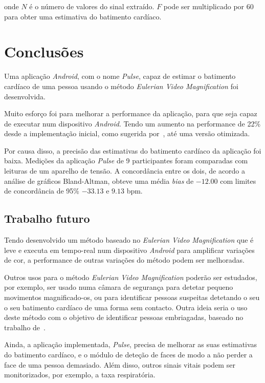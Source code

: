 \documentclass[9pt,a4paper]{extarticle}
\newcommand{\evm}{\emph{Eulerian Video Magnification}}
\begin{document}
\begin{multicols}{2}
onde $N$ é o número de valores do sinal extraído. $F$ pode ser multiplicado
por 60 para obter uma estimativa do batimento cardíaco.

\section{Conclusões}\label{sec:conclusions}

Uma aplicação \emph{Android}, com o nome \emph{Pulse}, capaz de estimar o
batimento cardíaco de uma pessoa usando o método \evm{} foi desenvolvida.

Muito esforço foi para melhorar a performance da aplicação, para que seja capaz
de executar num dispositivo \emph{Android}. Tendo um aumento na performance
de 22\% desde a implementação inicial, como sugerida por~\cite{Wu2012Eulerian},
até uma versão otimizada.

Por causa disso, a precisão das estimativas do batimento cardíaco da aplicação
foi baixa. Medições da aplicação \emph{Pulse} de 9 participantes foram
comparadas com leituras de um aparelho de tensão. A concordância entre os dois,
de acordo a análise de gráficos Bland-Altman, obteve uma média \emph{bias}
de $-12.00$ com limites de concordância de 95\% $-33.13$ e $9.13$ bpm.

\subsection{Trabalho futuro}\label{sec:future}

Tendo desenvolvido um método baseado no \evm{} que é leve e executa em
tempo-real num dispositivo \emph{Android} para amplificar variações de cor,
a performance de outras variações do método podem ser melhoradas.

Outros usos para o método \evm{} poderão ser estudados, por exemplo, ser usado
numa câmara de segurança para detetar pequeno movimentos magnificado-os, ou
para identificar pessoas suspeitas detetando o seu o seu batimento cardíaco de
uma forma sem contacto. Outra ideia seria o uso deste método com o objetivo de
identificar pessoas embriagadas, baseado no trabalho de~\cite{Koukiou2012Drunk}.

Ainda, a aplicação implementada, \emph{Pulse}, precisa de melhorar as suas
estimativas do batimento cardíaco, e o módulo de deteção de faces de modo a
não perder a face de uma pessoa demasiado. Além disso, outros sinais vitais
podem ser monitorizados, por exemplo, a taxa respiratória.



\end{multicols}
\end{document}
